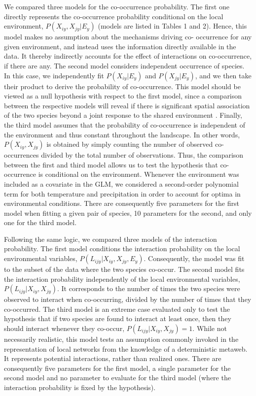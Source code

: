 \documentclass[12pt]{article}
\begin{document}
We compared three models for the co-occurrence probability. The first one
directly represents the co-occurrence probability conditional on the local
environment, $P(X_{iy},X_{jy}\lvert E_y)$ (models are listed in Tables 1 and 2).
Hence, this model makes no assumption about the mechanisms driving co-
occurrence for any given environment, and instead uses the information
directly available in the data. It thereby indirectly accounts for the effect
of interactions on co-occurrence, if there are any. The second model considers
independent occurrence of species. In this case, we independently fit
$P(X_{iy} \lvert E_y)$ and $P(X_{jy} \lvert E_y)$, and we then take their product to
derive the probability of co-occurrence. This model should be viewed as a null
hypothesis with respect to the first model, since a comparison between the
respective models will reveal if there is significant spatial association of
the two species beyond a joint response to the shared environment
\citep{Cazelles2016}. Finally, the third model assumes that the probability of
co-occurrence is independent of the environment and thus constant throughout
the landscape. In other words, $P(X_{iy},X_{jy})$ is obtained by simply
counting the number of observed co-occurrences divided by the total number of
observations. Thus, the comparison between the first and third model allows us
to test the hypothesis that co-occurrence is conditional on the environment.
Whenever the environment was included as a covariate in the GLM, we considered
a second-order polynomial term for both temperature and precipitation in
order to account for optima in environmental conditions. There are
consequently five parameters for the first model when fitting a given pair of
species, 10 parameters for the second, and only one for the third model.

Following the same logic, we compared three models of the interaction
probability. The first model conditions the interaction probability on the
local environmental variables, $P(L_{ijy}\lvert X_{iy},X_{jy},E_y)$. Consequently,
the model was fit to the subset of the data where the two species co-occur.
The second model fits the interaction probability independently of the local
environmental variables, $P(L_{ijy}\lvert X_{iy},X_{jy})$. It corresponds to the
number of times the two species were observed to interact when co-occurring,
divided by the number of times that they co-occurred. The third model is an
extreme case evaluated only to test the hypothesis that if two species are
found to interact at least once, then they should interact whenever they co-occur, $P(L_{ijy}\lvert X_{iy},X_{jy})=1$. While not necessarily realistic, this
model tests an assumption commonly invoked in the representation of local
networks from the knowledge of a deterministic metaweb. It represents
potential interactions, rather than realized ones. There are consequently five
parameters for the first model, a single parameter for the second model and no
parameter to evaluate for the third model (where the interaction probability
is fixed by the hypothesis).
\end{document}
